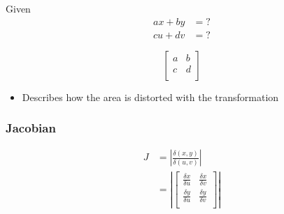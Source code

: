     Given
    \begin{align*}
      a x + b y &= ? \\
      c u + d v &= ?
    \end{align*}

    \begin{equation}
      \begin{bmatrix}
        a & b \\
        c & d \\
      \end{bmatrix}
    \end{equation}

    \begin{itemize}
      \item Describes how the area is distorted with the transformation
    \end{itemize}

    \subsubsection{Jacobian}

      \begin{align}
        J &= \left| \frac{\delta\left( x, y \right)}{\delta\left( u, v \right)} \right| \\
        &=
        \left|
          \begin{bmatrix}
            \frac{\delta x}{\delta u} & \frac{\delta x}{\delta v} \\
            \frac{\delta y}{\delta u} & \frac{\delta y}{\delta v} \\
          \end{bmatrix}
        \right|
      \end{align}